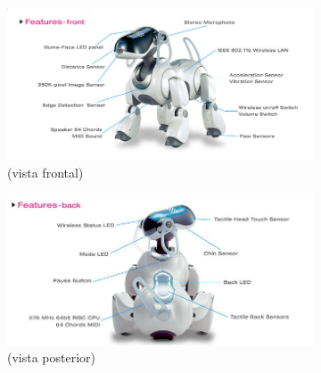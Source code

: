 \documentclass[12pt,a4paper,final,twoside]{article}
\begin{document}
\begin{figure}[h]
	\centering
        \begin{subfigure}[h]{0.5\textwidth}
                \includegraphics[width=\textwidth]{Imatges/ERS-7(front)}
                \caption{(vista frontal)}
        \end{subfigure}%
        \begin{subfigure}[h]{0.5\textwidth}
                \includegraphics[width=\textwidth]{Imatges/ERS-7(back)}
                \caption{(vista posterior)}
        \end{subfigure}
        \begin{subfigure}[bl]{0.5\textwidth}

\end{subfigure}
\end{figure}
\end{document}
